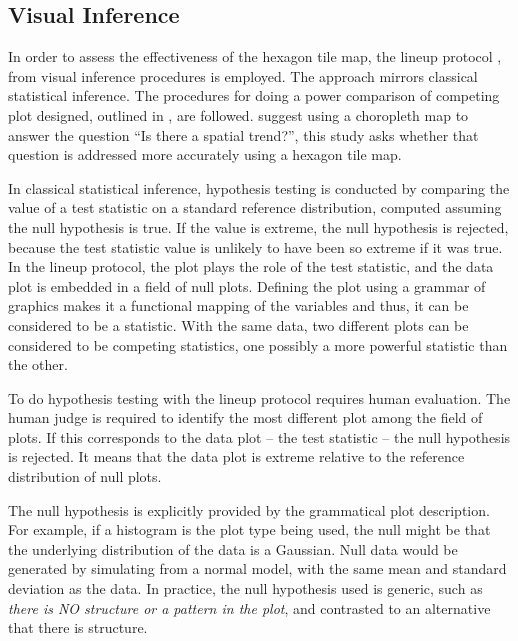 \documentclass{monashthesis}
\begin{document}
\hypertarget{visual-inference}{%
\subsection{Visual Inference}\label{visual-inference}}

In order to assess the effectiveness of the hexagon tile map, the lineup protocol \autocite{GIIV},\autocite{BCHLLSW09} from visual inference procedures is employed. The approach mirrors classical statistical inference. The procedures for doing a power comparison of competing plot designed, outlined in \textcite{GTPCCD}, are followed. \autocite{GIIV} suggest using a choropleth map to answer the question ``Is there a spatial trend?'', this study asks whether that question is addressed more accurately using a hexagon tile map.

In classical statistical inference, hypothesis testing is conducted by comparing the value of a test statistic on a standard reference distribution, computed assuming the null hypothesis is true. If the value is extreme, the null hypothesis is rejected, because the test statistic value is unlikely to have been so extreme if it was true. In the lineup protocol, the plot plays the role of the test statistic, and the data plot is embedded in a field of null plots. Defining the plot using a grammar of graphics \autocite{ggplot2} makes it a functional mapping of the variables and thus, it can be considered to be a statistic. With the same data, two different plots can be considered to be competing statistics, one possibly a more powerful statistic than the other.

To do hypothesis testing with the lineup protocol requires human evaluation. The human judge is required to identify the most different plot among the field of plots. If this corresponds to the data plot -- the test statistic -- the null hypothesis is rejected. It means that the data plot is extreme relative to the reference distribution of null plots.

The null hypothesis is explicitly provided by the grammatical plot description. For example, if a histogram is the plot type being used, the null might be that the underlying distribution of the data is a Gaussian. Null data would be generated by simulating from a normal model, with the same mean and standard deviation as the data. In practice, the null hypothesis used is generic, such as \emph{there is NO structure or a pattern in the plot}, and contrasted to an alternative that there is structure.
\end{document}
